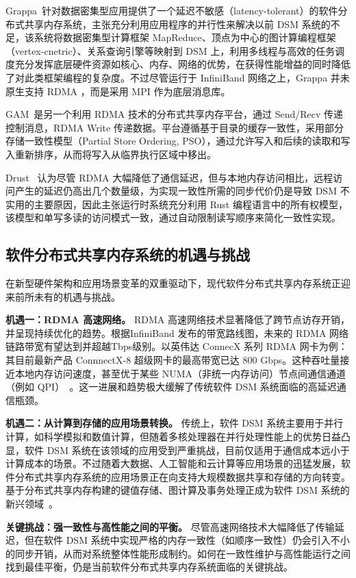 {Grappa~\citep{nelson2015grappa}针对数据密集型应用提供了一个延迟不敏感（latency-tolerant）的软件分布式共享内存系统，主张充分利用应用程序的并行性来解决以前 DSM 系统的不足，该系统将数据密集型计算框架 MapReduce、顶点为中心的图计算编程框架（vertex-cnetric）、关系查询引擎等映射到 DSM 上，利用多线程与高效的任务调度充分发挥底层硬件资源如核心、内存、网络的优势，在获得性能增益的同时降低了对此类框架编程的复杂度。不过尽管运行于 InfiniBand 网络之上，Grappa 并未原生支持 RDMA ，而是采用 MPI 作为底层消息库。

GAM~\citep{cai2018gam}是另一个利用 RDMA 技术的分布式共享内存平台，通过 Send/Recv 传递控制消息，RDMA Write 传递数据。平台遵循基于目录的缓存一致性，采用部分存储一致性模型（Partial Store Ordering, PSO），通过允许写入和后续的读取和写入重新排序，从而将写入从临界执行区域中移出。

Drust~\citep{haoranma2024drust} 认为尽管 RDMA 大幅降低了通信延迟，但与本地内存访问相比，远程访问产生的延迟仍高出几个数量级，为实现一致性所需的同步代价仍是导致 DSM 不实用的主要原因，因此主张运行时系统充分利用 Rust 编程语言中的所有权模型，该模型和单写多读的访问模式一致，通过自动限制读写顺序来简化一致性实现。

\subsection{软件分布式共享内存系统的机遇与挑战}
在新型硬件架构和应用场景变革的双重驱动下，现代软件分布式共享内存系统正迎来前所未有的机遇与挑战。

\textbf{机遇一：RDMA 高速网络。} RDMA 高速网络技术显著降低了跨节点访存开销，并呈现持续优化的趋势。根据InfiniBand 发布的带宽路线图，未来的 RDMA 网络链路带宽有望达到并超越Tbps级别。以英伟达 ConnecX 系列 RDMA 网卡为例：其目前最新产品 ConnnectX-8 超级网卡的最高带宽已达 800 Gbps。这种吞吐量接近本地内存访问速度，甚至优于某些 NUMA（非统一内存访问）节点间通信通道（例如 QPI）~\citep{cai2018gam}。这一进展和趋势极大缓解了传统软件 DSM 系统面临的高延迟通信瓶颈。

\textbf{机遇二：从计算到存储的应用场景转换。} 传统上，软件 DSM 系统主要用于并行计算，如科学模拟和数值计算，但随着多核处理器在并行处理性能上的优势日益凸显，软件 DSM 系统在该领域的应用受到严重挑战，目前仅适用于通信成本远小于计算成本的场景。不过随着大数据、人工智能和云计算等应用场景的迅猛发展，软件分布式共享内存系统的应用场景正在向支持大规模数据共享和存储的方向转变。基于分布式共享内存构建的键值存储、图计算及事务处理正成为软件 DSM 系统的新兴领域~\citep{nelson2015grappa}。

\textbf{关键挑战：强一致性与高性能之间的平衡。} 尽管高速网络技术大幅降低了传输延迟，但在软件 DSM 系统中实现严格的内存一致性（如顺序一致性）仍会引入不小的同步开销，从而对系统整体性能形成制约。如何在一致性维护与高性能运行之间找到最佳平衡，仍是当前软件分布式共享内存系统面临的关键挑战。

}
